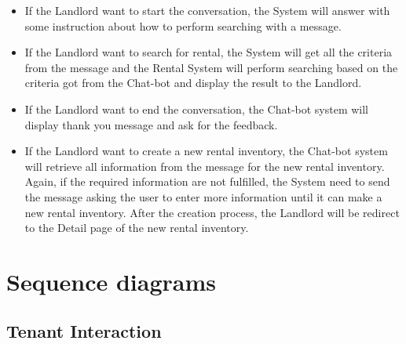 \begin{itemize}
    \item If the Landlord want to start the conversation, the System will answer with some instruction about how to perform searching with a message.
    \item If the Landlord want to search for rental, the System will get all the criteria from the message and the Rental System will perform searching based on the criteria got from the Chat-bot and display the result to the Landlord.
    \item If the Landlord want to end the conversation, the Chat-bot system will display thank you message and ask for the feedback.
    \item If the Landlord want to create a new rental inventory, the Chat-bot system will retrieve all information from the message for the new rental inventory. Again, if the required information are not fulfilled, the System need to send the message asking the user to enter more information until it can make a new rental inventory. After the creation process, the Landlord will be redirect to the Detail page of the new rental inventory.
\end{itemize}


\newpage
\section{Sequence diagrams}
\subsection{Tenant Interaction}
